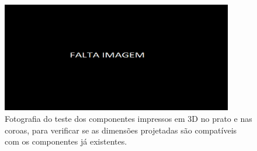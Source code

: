 \begin{figure}[htb]
    \centering
    \includegraphics[width = 0.9\textwidth]{Figures/Cap3/Falta_imagem_larga.png}
    \caption[Teste dos componentes impressos em 3D no prato e nas coroas]%
    {Fotografia do teste dos componentes impressos em 3D no prato e nas coroas, para verificar se as dimensões projetadas são compatíveis com os componentes já existentes.}
    \label{fig:teste_impressao_3d}
\end{figure}
\newpage
